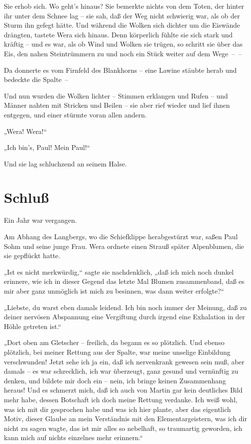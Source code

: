 Sie erhob sich. Wo geht's hinaus? Sie bemerkte nichts von dem
Toten, der hinter ihr unter dem Schnee lag – sie sah, daß der Weg
nicht schwierig war, als ob der Sturm ihn gefegt hätte. Und während
die Wolken sich dichter um die Eiswände drängten, tastete Wera sich
hinaus. Denn körperlich fühlte sie sich stark und kräftig – und es
war, als ob Wind und Wolken sie trügen, so schritt sie über das
Eis, den nahen Steintrümmern zu und noch ein Stück weiter auf dem
Wege~–~–

Da donnerte es vom Firnfeld des Blankhorns – eine Lawine stäubte
herab und bedeckte die Spalte~–

Und nun wurden die Wolken lichter – Stimmen erklangen und Rufen –
und Männer nahten mit Stricken und Beilen – sie aber rief wieder
und lief ihnen entgegen, und einer stürmte voran allen andern.

„Wera! Wera!“

„Ich bin's, Paul! Mein Paul!“

Und sie lag schluchzend an seinem Halse.

\section{Schluß}

Ein Jahr war vergangen.

Am Abhang des Langbergs, wo die Schiefklippe herabgestürzt war,
saßen Paul Sohm und seine junge Frau. Wera ordnete einen Strauß
später Alpenblumen, die sie gepflückt hatte.

„Ist es nicht merkwürdig,“ sagte sie nachdenklich, „daß ich mich
noch dunkel erinnere, wie ich in dieser Gegend das letzte Mal
Blumen zusammenband, daß es mir aber ganz unmöglich ist mich zu
besinnen, was dann weiter erfolgte?“

„Liebste, du warst eben damals leidend. Ich bin noch immer der
Meinung, daß zu deiner nervösen Abspannung eine Vergiftung durch
irgend eine Exhalation in der Höhle getreten ist.“

„Dort oben am Gletscher – freilich, da begann es so plötzlich. Und
ebenso plötzlich, bei meiner Rettung aus der Spalte, war meine
unselige Einbildung verschwunden! Jetzt sehe ich ja ein, daß ich
nervenkrank gewesen sein muß, aber damals – es war schrecklich, ich
war überzeugt, ganz gesund und vernünftig zu denken, und bildete
mir doch ein – nein, ich bringe keinen Zusammenhang heraus! Und es
schmerzt mich, daß ich auch von Martin gar kein deutliches Bild
mehr habe, dessen Botschaft ich doch meine Rettung verdanke. Ich
weiß wohl, was ich mit dir gesprochen habe und was ich hier plante,
aber das eigentlich Motiv, dieser Glaube an mein Verständnis mit
den Elementargeistern, was ich dir nicht zu sagen wagte, das ist
mir alles so nebelhaft, so traumartig geworden, ich kann mich auf
nichts einzelnes mehr erinnern.“

